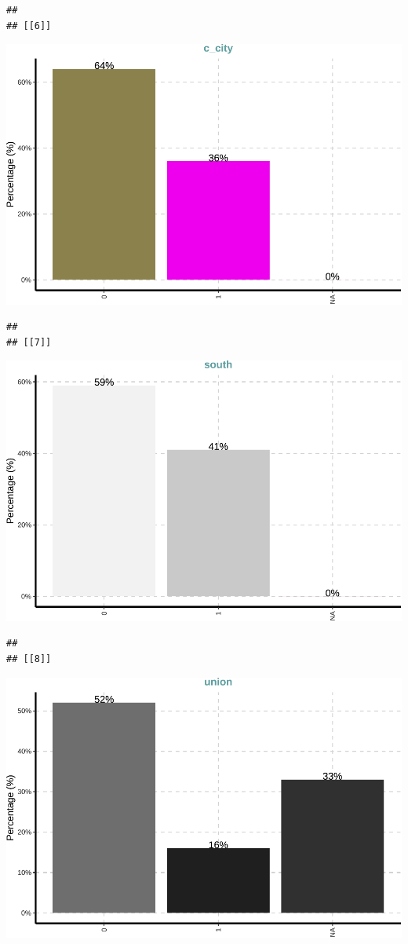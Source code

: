 \documentclass[
]{article}
\begin{document}
\begin{verbatim}
## 
## [[6]]
\end{verbatim}

\includegraphics{notebook_panel_data_files/figure-latex/Exploratory data analysis-6.pdf}

\begin{verbatim}
## 
## [[7]]
\end{verbatim}

\includegraphics{notebook_panel_data_files/figure-latex/Exploratory data analysis-7.pdf}

\begin{verbatim}
## 
## [[8]]
\end{verbatim}

\includegraphics{notebook_panel_data_files/figure-latex/Exploratory data analysis-8.pdf}
\end{document}
